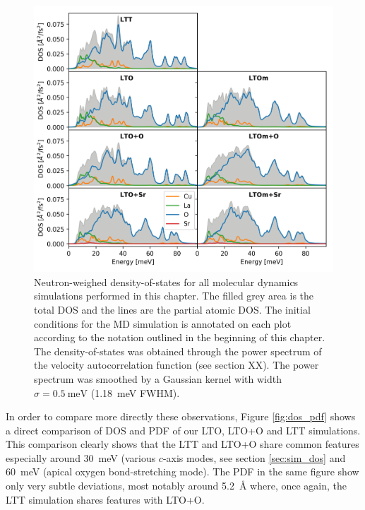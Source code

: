 \begin{figure}
	\centering
	\includegraphics[width=\textwidth]{fig/md/lto_defect_comparison.png}
	\caption[LTO MD DOS: Defect comparison]{Neutron-weighed density-of-states for all molecular dynamics simulations performed in this chapter. The filled grey area is the total DOS and the lines are the partial atomic DOS. The initial conditions for the MD simulation is annotated on each plot according to the notation outlined in the beginning of this chapter. The density-of-states was obtained through the power spectrum of the velocity autocorrelation function (see section XX). The power spectrum was smoothed by a Gaussian kernel with width $\sigma=\SI{0.5}{\milli\eV}$ (\SI{1.18}{\milli\eV} FWHM).}
	\label{fig:lto_md_defect_comparison}
\end{figure}

In order to compare more directly these observations, Figure \ref{fig:dos_pdf} shows a direct comparison of DOS and PDF of our LTO, LTO+O and LTT simulations. This comparison clearly shows that the LTT and LTO+O share common features especially around \SI{30}{\milli\eV} (various $c$-axis modes, see section \ref{sec:sim_dos} and \SI{60}{\milli\eV} (apical oxygen bond-stretching mode). The PDF in the same figure show only very subtle deviations, most notably around \SI{5.2}{\angstrom} where, once again, the LTT simulation shares features with LTO+O.

